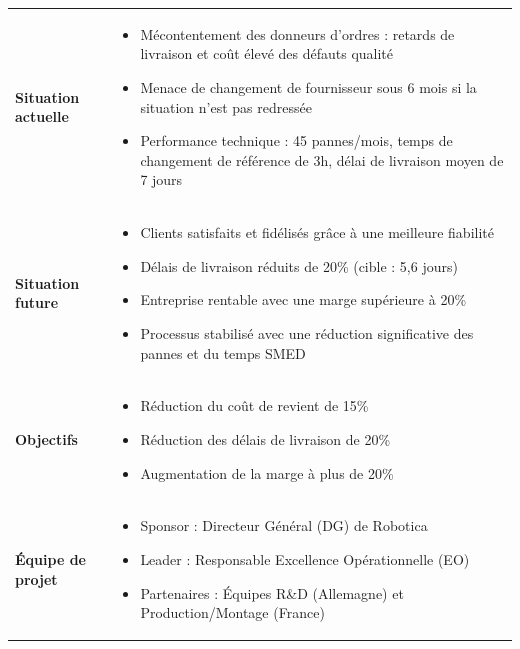 \documentclass[11pt,a4paper]{article}
\begin{document}
\begin{table}[H]
\small
\begin{tabularx}{\textwidth}{@{}lX@{}}
\toprule
\rowcolor{tableheader}
\multicolumn{2}{c}{\color{white}\textbf{Détails du Projet Robotica}} \\
\midrule
\textbf{Situation actuelle} & 
\begin{itemize}[nosep,leftmargin=1em]
  \item Mécontentement des donneurs d'ordres : retards de livraison et coût élevé des défauts qualité
  \item Menace de changement de fournisseur sous 6 mois si la situation n'est pas redressée
  \item Performance technique : 45 pannes/mois, temps de changement de référence de 3h, délai de livraison moyen de 7 jours
\end{itemize} \\
\rowcolor{lightgray}
\textbf{Situation future} & 
\begin{itemize}[nosep,leftmargin=1em]
  \item Clients satisfaits et fidélisés grâce à une meilleure fiabilité
  \item Délais de livraison réduits de 20\% (cible : 5,6 jours)
  \item Entreprise rentable avec une marge supérieure à 20\%
  \item Processus stabilisé avec une réduction significative des pannes et du temps SMED
\end{itemize} \\
\textbf{Objectifs} & 
\begin{itemize}[nosep,leftmargin=1em]
  \item Réduction du coût de revient de 15\%
  \item Réduction des délais de livraison de 20\%
  \item Augmentation de la marge à plus de 20\%
\end{itemize} \\
\rowcolor{lightgray}
\textbf{Équipe de projet} & 
\begin{itemize}[nosep,leftmargin=1em]
  \item Sponsor : Directeur Général (DG) de Robotica
  \item Leader : Responsable Excellence Opérationnelle (EO)
  \item Partenaires : Équipes R\&D (Allemagne) et Production/Montage (France)
\end{itemize} \\

\end{tabularx}
\end{table}
\end{document}
